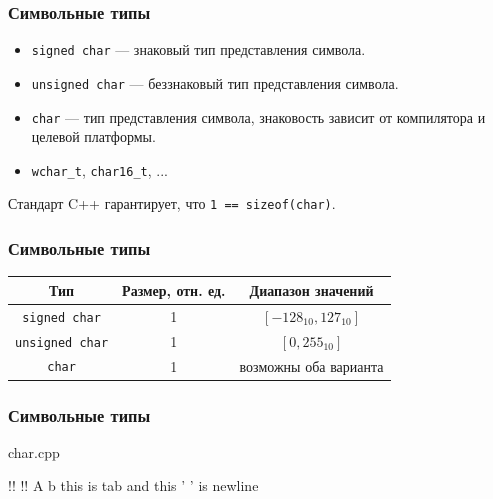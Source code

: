 \documentclass[compress, 8pt, aspectratio=169]{beamer}
\begin{document}
\begin{frame}[fragile]

    \frametitle{Символьные типы}

    \begin{itemize}
        \item \verb|signed char| --- знаковый тип представления символа.
        \item \verb|unsigned char| --- беззнаковый тип представления символа.
        \item \verb|char| --- тип представления символа, знаковость зависит от
            компилятора и целевой платформы.
        \item \verb|wchar_t|, \verb|char16_t|, ...
    \end{itemize}

    \hfill \break
    Стандарт C++ гарантирует, что \verb|1 == sizeof(char)|.

\end{frame}

\begin{frame}[fragile]

    \frametitle{Символьные типы}

    \begin{center}
        \begin{tabular}{|c|c|c|}
            \hline
            Тип & Размер, отн. ед. & Диапазон значений \\
            \hline
            \hline
            \verb|signed char| & 1 & \([-128_{10}, 127_{10}]\) \\
            \verb|unsigned char| & 1 & \([0, 255_{10}]\) \\
            \verb|char| & 1 & возможны оба варианта \\
            \hline
        \end{tabular}
    \end{center}

\end{frame}

\begin{frame}[fragile]

    \frametitle{Символьные типы}

        {char.cpp}

    \begin{terminalwindow}
!!
!!
A
b
this is tab     and this '
' is newline
    \end{terminalwindow}

\end{frame}
\end{document}
